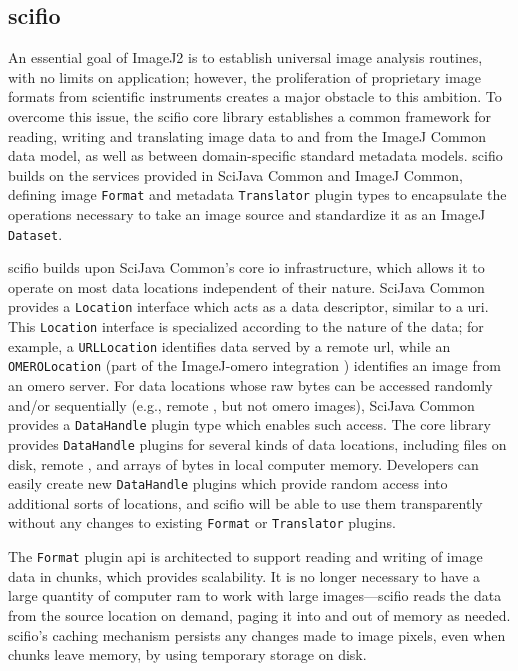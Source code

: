 \documentclass{bmcart}
\begin{document}
\subsection*{\acrshort{scifio}} An essential goal of ImageJ2 is to establish
universal image analysis routines, with no limits on application; however, the
proliferation of proprietary image formats from scientific instruments creates
a major obstacle to this ambition. To overcome this issue, the
\acrshort{scifio} core library establishes a common framework for reading,
writing and translating image data to and from the ImageJ Common data model, as
well as between domain-specific standard metadata models. \acrshort{scifio}
builds on the services provided in SciJava Common and ImageJ Common, defining
image \texttt{Format} and metadata \texttt{Translator} plugin types to
encapsulate the operations necessary to take an image source and standardize it
as an ImageJ \texttt{Dataset}.

\acrshort{scifio} builds upon SciJava Common's core \acrshort{io}
infrastructure, which allows it to operate on most data locations independent
of their nature. SciJava Common provides a \texttt{Location} interface which
acts as a data descriptor, similar to a \acrfull{uri}. This \texttt{Location}
interface is specialized according to the nature of the data; for example, a
\texttt{URLLocation} identifies data served by a remote \acrfull{url}, while
an \texttt{OMEROLocation} (part of the ImageJ-\acrshort{omero} integration
\cite{imagej_omero}) identifies an image from an \acrshort{omero} server. For
data locations whose raw bytes can be accessed randomly and/or sequentially
(e.g., remote , but not \acrshort{omero} images), SciJava
Common provides a \texttt{DataHandle} plugin type which enables such access.
The core library provides \texttt{DataHandle} plugins for several kinds of data
locations, including files on disk, remote , and arrays of
bytes in local computer memory. Developers can easily create new
\texttt{DataHandle} plugins which provide random access into additional sorts
of locations, and \acrshort{scifio} will be able to use them transparently
without any changes to existing \texttt{Format} or \texttt{Translator} plugins.

The \texttt{Format} plugin \acrshort{api} is architected to support reading and
writing of image data in chunks, which provides scalability. It is no longer
necessary to have a large quantity of computer \acrshort{ram} to work with
large images---\acrshort{scifio} reads the data from the source location on
demand, paging it into and out of memory as needed. \acrshort{scifio}'s caching
mechanism persists any changes made to image pixels, even when chunks leave
memory, by using temporary storage on disk.
\end{document}
